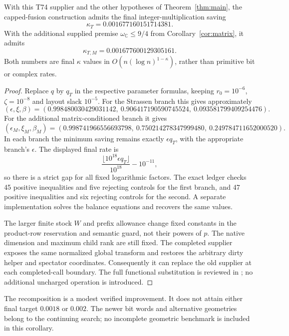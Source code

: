 \begin{corollary}\label{cor:t74}
With this T74 supplier and the other hypotheses of Theorem~\ref{thm:main}, the capped-fusion construction admits the final integer-multiplication saving
\[
 \boxed{\kappa_T=0.001677160151714381.}
\]
With the additional supplied premise $\omega_{\mathbb C}\leq9/4$ from Corollary~\ref{cor:matrix}, it admits
\[
 \boxed{\kappa_{T,M}=0.001677600129305161.}
\]
Both numbers are final $\kappa$ values in $O(n(\log n)^{1-\kappa})$, rather than primitive bit or complex rates.
\end{corollary}
\begin{proof}
Replace $q$ by $q_T$ in the respective parameter formulas, keeping $r_0=10^{-6}$, $\zeta=10^{-8}$ and layout slack $10^{-5}$. For the Strassen branch this gives approximately
\[
 (\epsilon,\xi,\beta)=
 (0.998480030429031142,\ 0.906417190590745524,\ 0.093581799409254476).
\]
For the additional matrix-conditioned branch it gives
\[
 (\epsilon_M,\xi_M,\beta_M)=
 (0.998741966556693798,\ 0.750214278347999480,\ 0.249784711652000520).
\]
In each branch the minimum saving remains exactly $\epsilon q_T$, with the appropriate branch's $\epsilon$. The displayed final rate is
\[
 \frac{\lfloor10^{18}\epsilon q_T\rfloor}{10^{18}}-10^{-11},
\]
so there is a strict gap for all fixed logarithmic factors. The exact ledger checks 45 positive inequalities and five rejecting controls for the first branch, and 47 positive inequalities and six rejecting controls for the second. A separate implementation solves the balance equations and recovers the same values.

The larger finite stock $W$ and prefix allowance change fixed constants in the product-row reservation and semantic guard, not their powers of $p$. The native dimension and maximum child rank are still fixed. The completed supplier exposes the same normalized global transform and restores the arbitrary dirty helper and spectator coordinates. Consequently it can replace the old supplier at each completed-call boundary. The full functional substitution is reviewed in ; no additional uncharged operation is introduced.
\end{proof}

The recomposition is a modest verified improvement. It does not attain either final target $0.0018$ or $0.002$. The newer bit words and alternative geometries belong to the continuing search; no incomplete geometric benchmark is included in this corollary.
